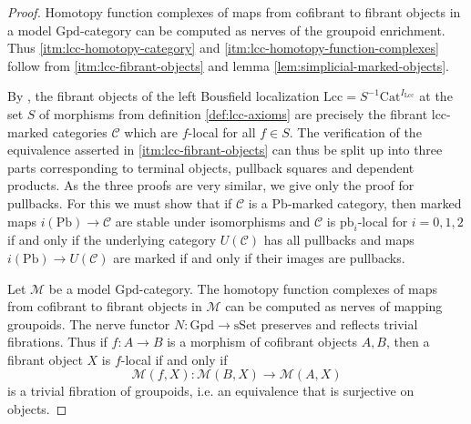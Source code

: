 \documentclass[a4paper]{article}
\theoremstyle{remark}
\theoremstyle{definition}
\begin{document}
\begin{proof}
  Homotopy function complexes of maps from cofibrant to fibrant objects in a model $\mathrm{Gpd}$-category can be computed as nerves of the groupoid enrichment.
  Thus \ref{itm:lcc-homotopy-category} and \ref{itm:lcc-homotopy-function-complexes} follow from \ref{itm:lcc-fibrant-objects} and lemma \ref{lem:simplicial-marked-objects}.

  By \cite[Theorem 4.1.1]{hirschhorn}, the fibrant objects of the left Bousfield localization $\mathrm{Lcc} = S^{-1} \mathrm{Cat}^{I_\mathrm{Lcc}}$ at the set $S$ of morphisms from definition \ref{def:lcc-axioms} are precisely the fibrant lcc-marked categories $\mathcal{C}$ which are $f$-local for all $f \in S$.
  The verification of the equivalence asserted in \ref{itm:lcc-fibrant-objects} can thus be split up into three parts corresponding to terminal objects, pullback squares and dependent products.
  As the three proofs are very similar, we give only the proof for pullbacks.
  For this we must show that if $\mathcal{C}$ is a $\mathrm{Pb}$-marked category, then marked maps $i(\mathrm{Pb}) \rightarrow \mathcal{C}$ are stable under isomorphisms and $\mathcal{C}$ is $\mathrm{pb}_i$-local for $i = 0, 1, 2$ if and only if the underlying category $U(\mathcal{C})$ has all pullbacks and maps $i(\mathrm{Pb}) \rightarrow U(\mathcal{C})$ are marked if and only if their images are pullbacks.

  Let $\mathcal{M}$ be a model $\mathrm{Gpd}$-category.
  The homotopy function complexes of maps from cofibrant to fibrant objects in $\mathcal{M}$ can be computed as nerves of mapping groupoids.
  The nerve functor $N : \mathrm{Gpd} \rightarrow \mathrm{sSet}$ preserves and reflects trivial fibrations.
  Thus if $f : A \rightarrow B$ is a morphism of cofibrant objects $A, B$, then a fibrant object $X$ is $f$-local if and only if
  \begin{equation}
    \label{eq:locality}
    \mathcal{M}(f, X) : \mathcal{M}(B, X) \rightarrow \mathcal{M}(A, X)
  \end{equation}
  is a trivial fibration of groupoids, i.e. an equivalence that is surjective on objects.
  

\end{proof}
\end{document}
